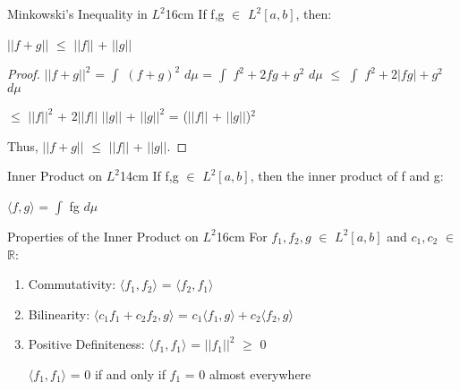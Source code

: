     \vspace{0.5cm}



    \begin{wtheorem}{Minkowski's Inequality in $L^2$}{16cm}
        If f,g $\in$ $L^2[a,b]$, then:

        \hspace{0.5cm}
        $||f+g||$ $\leq$ $||f||$ + $||g||$
    \end{wtheorem}

    \begin{proof}
        $||f+g||^2$
        = $\int$ $(f+g)^2$ $d\mu$
        = $\int$ $f^2 + 2fg + g^2$ $d\mu$
        $\leq$ $\int$ $f^2 + 2|fg| + g^2$ $d\mu$

        \hspace{1.6cm}
        $\leq$ $||f||^2$ + $2||f||$ $||g||$ + $||g||^2$
        = ($||f||$ + $||g||$)$^2$
        
        Thus, $||f+g||$ $\leq$ $||f||$ + $||g||$.
    \end{proof}

    \vspace{0.5cm}



    \begin{definition}{Inner Product on $L^2$}{14cm}
        If f,g $\in$ $L^2[a,b]$, then the {\color{red} inner product}
        of f and g:

        \hspace{0.5cm}
        $\langle f,g \rangle$ = $\int$ fg $d\mu$
    \end{definition}

    \vspace{0.5cm}



    \begin{wtheorem}{Properties of the Inner Product on $L^2$}{16cm}
        For $f_1,f_2,g$ $\in$ $L^2[a,b]$ and $c_1,c_2$ $\in$ $\mathbb{R}$:
    \end{wtheorem}

    \begin{enumerate}[label=(\alph*), leftmargin=2cm, itemsep=0.1cm]
        \item {\color{lgreen} Commutativity}:
            $\langle f_1,f_2 \rangle$ = $\langle f_2,f_1 \rangle$

        \item {\color{lgreen} Bilinearity}:
            $\langle c_1f_1 + c_2f_2 , g \rangle$
            = $c_1 \langle f_1,g \rangle + c_2 \langle f_2,g \rangle$

        \item {\color{lgreen} Positive Definiteness}:
            $\langle f_1,f_1 \rangle$ = $||f_1||^2$ $\geq$ 0

            $\langle f_1,f_1 \rangle$ = 0 if and only if $f_1$ = 0 almost everywhere
    \end{enumerate}

